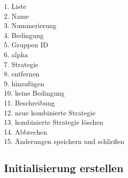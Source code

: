 \begin{description}

\item[1. Liste] 

\item[2. Name] 

\item[3. Nummerierung] 

\item[4. Bedingung] 

\item[5. Gruppen ID] 

\item[6. alpha] 

\item[7. Strategie] 

\item[8. entfernen] 

\item[9. hinzufügen] 

\item[10. keine Bedingung] 

\item[11. Beschreibung] 

\item[12. neue kombinierte Strategie] 

\item[13. kombinierte Strategie löschen] 

\item[14. Abbrechen] 

\item[15. Änderungen speichern und schließen] 

\end{description}

\pagebreak

\subsection{Initialisierung erstellen}

